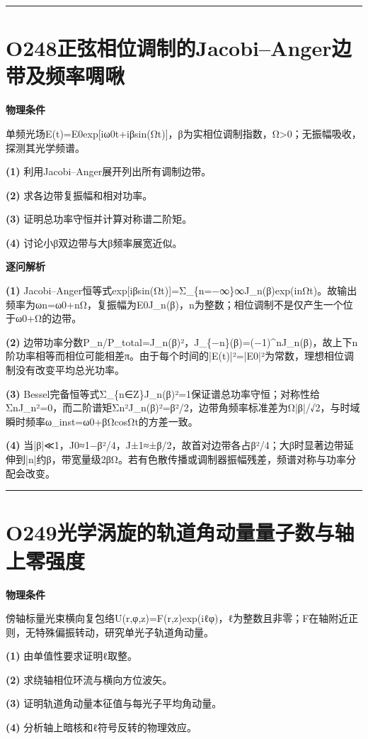 \documentclass[UTF8,a4paper,11pt,oneside,openany]{ctexbook}
\begin{document}
\par\bigskip\hrule\bigskip
\section*{O248\quad 正弦相位调制的Jacobi–Anger边带及频率啁啾}
\textbf{物理条件}\par 单频光场E(t)=E0exp[iω0t+iβsin(Ωt)]，β为实相位调制指数，Ω>0；无振幅吸收，探测其光学频谱。
\par\noindent\textbf{(1)} 利用Jacobi–Anger展开列出所有调制边带。
\par\noindent\textbf{(2)} 求各边带复振幅和相对功率。
\par\noindent\textbf{(3)} 证明总功率守恒并计算对称谱二阶矩。
\par\noindent\textbf{(4)} 讨论小β双边带与大β频率展宽近似。

\par\medskip\noindent\textbf{逐问解析}
\par\noindent\textbf{(1)} Jacobi–Anger恒等式exp[iβsin(Ωt)]=Σ\_\{n=−∞\}∞J\_n(β)exp(inΩt)。故输出频率为ωn=ω0+nΩ，复振幅为E0J\_n(β)，n为整数；相位调制不是仅产生一个位于ω0+Ω的边带。
\par\noindent\textbf{(2)} 边带功率分数P\_n/P\_total=J\_n(β)²，J\_\{−n\}(β)=(−1)\textasciicircum{}nJ\_n(β)，故上下n阶功率相等而相位可能相差π。由于每个时间的|E(t)|²=|E0|²为常数，理想相位调制没有改变平均总光功率。
\par\noindent\textbf{(3)} Bessel完备恒等式Σ\_\{n∈Z\}J\_n(β)²=1保证谱总功率守恒；对称性给ΣnJ\_n²=0，而二阶谱矩Σn²J\_n(β)²=β²/2，边带角频率标准差为Ω|β|/√2，与时域瞬时频率ω\_inst=ω0+βΩcosΩt的方差一致。
\par\noindent\textbf{(4)} 当|β|≪1，J0≈1−β²/4，J±1≈±β/2，故首对边带各占β²/4；大β时显著边带延伸到|n|约β，带宽量级2βΩ。若有色散传播或调制器振幅残差，频谱对称与功率分配会改变。

\par\bigskip\hrule\bigskip
\section*{O249\quad 光学涡旋的轨道角动量量子数与轴上零强度}
\textbf{物理条件}\par 傍轴标量光束横向复包络U(r,φ,z)=F(r,z)exp(iℓφ)，ℓ为整数且非零；F在轴附近正则，无特殊偏振转动，研究单光子轨道角动量。
\par\noindent\textbf{(1)} 由单值性要求证明ℓ取整。
\par\noindent\textbf{(2)} 求绕轴相位环流与横向方位波矢。
\par\noindent\textbf{(3)} 证明轨道角动量本征值与每光子平均角动量。
\par\noindent\textbf{(4)} 分析轴上暗核和ℓ符号反转的物理效应。
\end{document}
